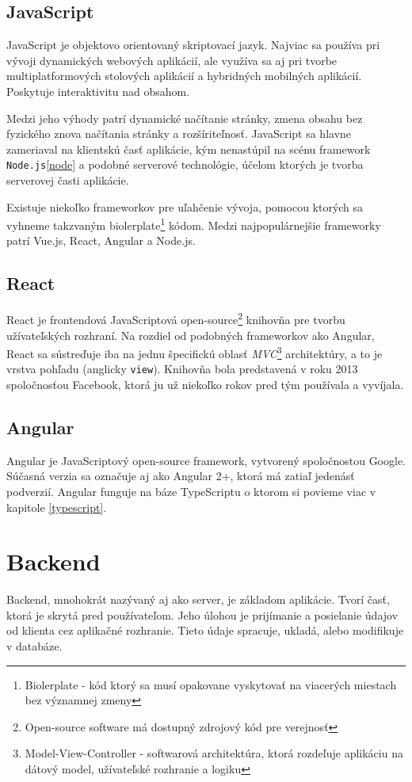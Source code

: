 \subsection{JavaScript}
JavaScript je objektovo orientovaný skriptovací jazyk. Najviac sa používa pri vývoji dynamických webových aplikácií, ale využíva sa aj pri tvorbe multiplatformových stolových aplikácií a hybridných mobilných aplikácií. Poskytuje interaktivitu nad obsahom. 

Medzi jeho výhody patrí dynamické načítanie stránky, zmena obsahu bez fyzického znova načítania stránky a rozšíriteľnosť. JavaScript sa hlavne zameriaval na klientskú časť aplikácie, kým nenastúpil na scénu framework \texttt{Node.js}\ref{node} a podobné serverové technológie, účelom ktorých je tvorba serverovej časti aplikácie.

Existuje niekoľko frameworkov pre uľahčenie vývoja, pomocou ktorých sa vyhneme takzvaným biolerplate\footnote{Biolerplate - kód ktorý sa musí opakovane vyskytovať na viacerých miestach bez významnej zmeny} kódom. Medzi najpopulárnejšie frameworky patrí Vue.js, React, Angular a Node.js.

\subsection{React}
React je frontendová JavaScriptová open-source\footnote{Open-source software má dostupný zdrojový kód pre verejnosť} knihovňa pre tvorbu užívateľských rozhraní. Na rozdiel od podobných frameworkov ako Angular, React sa sústreďuje iba na jednu špecifickú oblasť \textit{MVC}\footnote{Model-View-Controller - softwarová architektúra, ktorá rozdeľuje aplikáciu na dátový model, užívateľské rozhranie a logiku} architektúry, a to je vrstva pohľadu (anglicky \texttt{view}). Knihovňa bola predstavená v roku 2013 spoločnosťou Facebook, ktorá ju už niekoľko rokov pred tým používala a vyvíjala. 

\subsection{Angular}
Angular je JavaScriptový open-source framework, vytvorený spoločnostou Google. Súčasná verzia sa označuje aj ako Angular 2+, ktorá má zatiaľ jedenásť podverzií. Angular funguje na báze TypeScriptu o ktorom si povieme viac v kapitole \ref{typescript}.

\section{Backend}
Backend, mnohokrát nazývaný aj ako server, je základom aplikácie. Tvorí časť, ktorá je skrytá pred používateľom. Jeho úlohou je prijímanie a posielanie údajov od klienta cez aplikačné rozhranie. Tieto údaje spracuje, ukladá, alebo modifikuje v databáze. 

